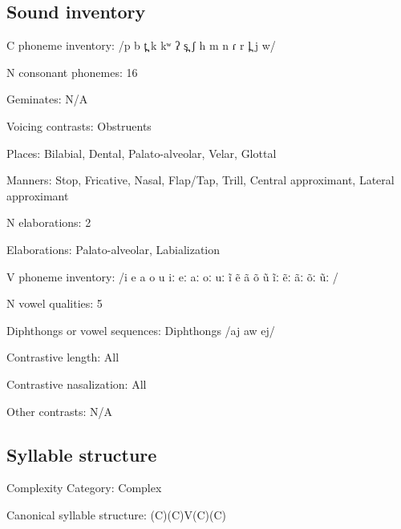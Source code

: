 {\subsection*{Sound inventory}
\begin{appendixdesc}

\item[C phoneme inventory:] /p b t̪ k kʷ ʔ s̪ ʃ h m n ɾ r l̪ j w/

\item[N consonant phonemes:] 16

\item[Geminates:] N/A

\item[Voicing contrasts:] Obstruents

\item[Places:] Bilabial, Dental, Palato-alveolar, Velar, Glottal

\item[Manners:] Stop, Fricative, Nasal, Flap/Tap, Trill, Central approximant, Lateral approximant

\item[N elaborations:] 2

\item[Elaborations:] Palato-alveolar, Labialization

\item[V phoneme inventory:] /i e a o u iː eː aː oː uː ĩ ẽ ã õ ũ ĩː ẽː ãː õː ũː /

\item[N vowel qualities:] 5

\item[Diphthongs or vowel sequences:] Diphthongs /aj aw ej/

\item[Contrastive length:] All

\item[Contrastive nasalization:] All

\item[Other contrasts:] N/A
\end{appendixdesc}
\subsection*{Syllable structure}
\begin{appendixdesc}

\item[Complexity Category:] Complex

\item[Canonical syllable structure:] (C)(C)V(C)(C) \citep[20--21]{Holt1999}


\end{appendixdesc}}
